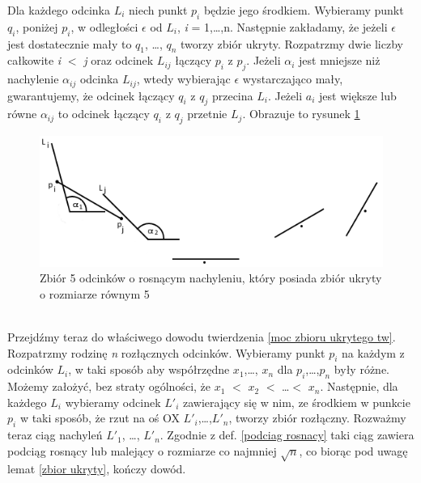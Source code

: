 \documentclass[brudnopis]{xmgr}
\begin{document}
Dla każdego odcinka $L_i$ niech punkt $p_i$ będzie jego środkiem. Wybieramy punkt $q_i$, poniżej $p_i$, w odległości $\epsilon$ od $L_i$, \textit{i} = 1,\ldots,n. Następnie zakładamy, że jeżeli $\epsilon$ jest dostatecznie mały to $q_1$, \ldots, $q_n$ tworzy zbiór ukryty. Rozpatrzmy dwie liczby całkowite \textit{i} $<$ \textit{j} oraz odcinek $L_{ij}$ łączący $p_i$ z $p_j$. Jeżeli $\alpha_i$ jest mniejsze niż nachylenie $\alpha_{ij}$ odcinka $L_{ij}$, wtedy wybierając $\epsilon$ wystarczająco mały, gwarantujemy, że odcinek łączący $q_i$ z $q_j$ przecina $L_i$. Jeżeli $a_i$ jest większe lub równe $\alpha_{ij}$ to odcinek łączący $q_i$ z $q_j$ przetnie $L_j$. Obrazuje to rysunek \ref{fig:5 zbior ukryty}
\begin{figure}[ht!]
  \centering
   \includegraphics{rysunki/5_odcinkow_zbior_ukryty.png}
   \caption{Zbiór 5 odcinków o rosnącym nachyleniu, który posiada zbiór ukryty o rozmiarze równym 5}
   \label{fig:5 zbior ukryty}
\end{figure}
\\Przejdźmy teraz do właściwego dowodu twierdzenia \ref{moc zbioru ukrytego tw}.
\\Rozpatrzmy rodzinę \textit{n} rozłącznych odcinków. Wybieramy punkt $p_i$ na każdym z odcinków $L_i$, w taki sposób aby współrzędne $x_1$,\ldots, $x_n$ dla $p_i$,\ldots,$p_n$ były różne. Możemy założyć, bez straty ogólności, że $x_1$ $<$ $x_2$ $<$ \ldots $<$ $x_n$. Następnie, dla każdego $L_i$ wybieramy odcinek $L'_i$ zawierający się w nim, ze środkiem w punkcie $p_i$ w taki sposób, że rzut na oś OX $L'_i$,\ldots,$L'_n$, tworzy zbiór rozłączny. Rozważmy teraz ciąg nachyleń $L'_1$, \ldots, $L'_n$. Zgodnie z def. \ref{podciag rosnacy} taki ciąg zawiera podciąg rosnący lub malejący o rozmiarze co najmniej $\sqrt{n}$, co biorąc pod uwagę lemat \ref{zbior ukryty}, kończy dowód.

\end{document}
